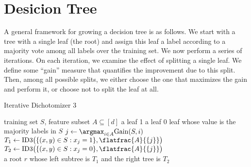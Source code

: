 \section{Desicion Tree}

A general framework for growing a decision tree is as follows. We start with a tree with a single leaf (the root) and assign this leaf a label according to a majority vote among all labels over the training set. We now perform a series of iterations. On each iteration, we examine the effect of splitting a single leaf. We define some “gain” measure that quantifies the improvement due to this split. Then, among all possible splits, we either choose the one that maximizes the gain and perform it, or choose not to split the leaf at all.

\begin{algorithm}[htbp]
	\caption{Iterative Dichotomizer 3}
	\label{ID3}
	\begin{algorithmic}[1]
		\renewcommand{\algorithmicrequire}{\textbf{Input:}}
		\renewcommand{\algorithmicensure}{\textbf{Output:}}
		\renewcommand{\algorithmiccomment}[1]{\hfill\textit{\textcolor{blue}{\##1}}}
		\REQUIRE training set $S$, feature subset $A\subseteq[d]$
		\RETURN a leaf 1
		\RETURN a leaf 0
		\RETURN leaf whose value is the majority labels in $S$
		\ENDIF
		\STATE $j\gets \argmax_{i\in A}\mathrm{Gain}(S,i)$\\[2pt]
		\STATE $T_1\gets \mathrm{ID3}\big(\{(x,y)\in S:x_j=1\},\flatfrac{A}{\{j\}}\big)$\\[2pt]
		\STATE $T_2\gets \mathrm{ID3}\big(\{(x,y)\in S:x_j=0\},\flatfrac{A}{\{j\}}\big)$\\[2pt]
		\RETURN a root $r$ whose left subtree is  $T_1$ and the right tree is $T_2$
	\end{algorithmic} 
\end{algorithm}
